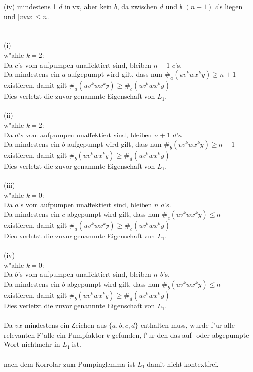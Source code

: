\documentclass{article}
\newcommand{\gap}{\null\ \\ \\}
\begin{document}
(iv) mindestens 1 $d$ in vx, aber kein $b$,
    da zwischen $d$ und $b$ $(n+1)$ $c$'s liegen und $|vwx| \leq n$.\\
\gap
(i)\\
w"ahle $k=2$:\\
Da $c$'s vom aufpumpen unaffektiert sind, bleiben $n+1$ $c$'s.\\
Da mindestens ein $a$ aufgepumpt wird gilt, dass nun $\#_a(uv^kwx^ky) \geq n+1$
    existieren, damit gilt $\#_a(uv^kwx^ky) \geq \#_c(uv^kwx^ky)$\\
Dies verletzt die zuvor genannnte Eigenschaft von $L_1$.\\
\\
(ii)\\
w"ahle $k=2$:\\
Da $d$'s vom aufpumpen unaffektiert sind, bleiben $n+1$ $d$'s.\\
Da mindestens ein $b$ aufgepumpt wird gilt, dass nun $\#_b(uv^kwx^ky) \geq n+1$
    existieren, damit gilt $\#_b(uv^kwx^ky) \geq \#_d(uv^kwx^ky)$\\
Dies verletzt die zuvor genannnte Eigenschaft von $L_1$.\\
\\
(iii)\\
w"ahle $k=0$:\\
Da $a$'s vom aufpumpen unaffektiert sind, bleiben $n$ $a$'s.\\
Da mindestens ein $c$ abgepumpt wird gilt, dass nun $\#_c(uv^kwx^ky) \leq n$
    existieren, damit gilt $\#_a(uv^kwx^ky) \geq \#_c(uv^kwx^ky)$\\
Dies verletzt die zuvor genannnte Eigenschaft von $L_1$.\\
\\
(iv)\\
w"ahle $k=0$:\\
Da $b$'s vom aufpumpen unaffektiert sind, bleiben $n$ $b$'s.\\
Da mindestens ein $b$ abgepumpt wird gilt, dass nun $\#_b(uv^kwx^ky) \leq n$
    existieren, damit gilt $\#_b(uv^kwx^ky) \geq \#_d(uv^kwx^ky)$\\
Dies verletzt die zuvor genannnte Eigenschaft von $L_1$.\\
\\
Da $vx$ mindestens ein Zeichen aus $\{a,b,c,d\}$ enthalten muss, wurde f"ur 
    alle relevanten F"alle ein Pumpfaktor $k$ gefunden, f"ur den das
    auf- oder abgepumpte Wort nichtmehr in $L_1$ ist.\\
\\
nach dem Korrolar zum Pumpinglemma ist $L_1$ damit nicht kontextfrei.\\
\end{document}
